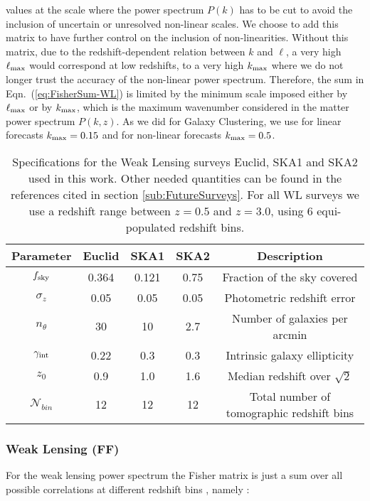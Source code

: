 values at the scale where the power spectrum $P(k)$ has to be cut
to avoid the inclusion of uncertain or unresolved non-linear scales. We choose to add this matrix to have 
further control on the inclusion of non-linearities. Without this matrix, due to the redshift-dependent relation between
$k$ and $\ell$, a very high $\ell_{\mathrm{max}}$ would correspond at low redshifts, to a very high $k_{\rm max}$ where we do not longer
trust the accuracy of the non-linear power spectrum. Therefore, the sum in Eqn.\ (\ref{eq:FisherSum-WL}) is limited by the minimum scale imposed
either by $\ell_{\mathrm{max}}$ or by $k_{\rm max}$, which is the maximum wavenumber considered in the matter power spectrum $P(k,z)$. As we did for Galaxy Clustering, we use for linear forecasts $k_{\rm max}=0.15$ and for non-linear forecasts $k_{\rm max}=0.5$.

\begin{table}[h]
\centering{}
\begin{tabular}{|c|ccc|c|}
\hline 
\Tstrut \textbf{Parameter}  & \textbf{Euclid}  & \textbf{SKA1}  & \textbf{SKA2}  &
\textbf{Description}\tabularnewline
\hline 
\Tstrut $f_{\rm sky}$  & 0.364  & 0.121  & 0.75 & Fraction of the sky covered\tabularnewline
$\sigma_{z}$  & 0.05  & 0.05  & 0.05  & Photometric redshift
error\tabularnewline
$n_{\theta}$  & 30  & 10  & 2.7  & Number of galaxies per arcmin\tabularnewline 
$\gamma_{\rm int}$  & 0.22  & 0.3  & 0.3  & Intrinsic galaxy ellipticity \tabularnewline
$z_{0}$  & 0.9  & 1.0  & 1.6  & Median redshift over $\sqrt{2}$ \tabularnewline
$\mathcal{N}_{bin}$ & 12 & 12 & 12 & Total number of tomographic redshift bins
\tabularnewline
\hline 
\end{tabular}\caption[Specifications for future WL surveys.]{\label{tab:WL-specifications} Specifications for
the Weak Lensing
surveys Euclid, SKA1 and SKA2 used in this work. Other needed quantities can be found in the references cited in section \ref{sub:FutureSurveys}.
For all WL surveys we use a redshift range between $z=0.5$ and $z=3.0$, using 6 equi-populated redshift bins.}
\end{table}

\subsubsection{Weak Lensing \label{sub:Weak-Lensing} (FF)}

For the weak lensing power spectrum the Fisher matrix is just a sum
over all possible correlations at different redshift bins \citep{tegmark_measuring_1998},
namely :

